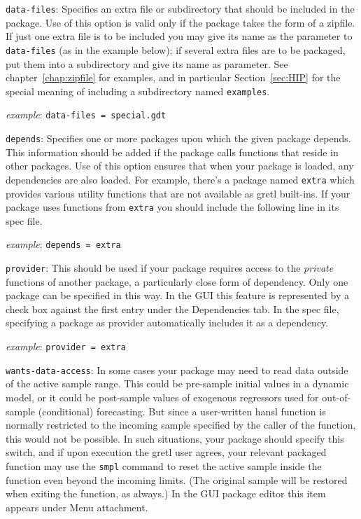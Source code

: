\documentclass[oneside]{book}
\newcommand{\ttusage}[1]{\textit{example}: \quad \texttt{#1}}
\begin{document}
\begin{description}

\item \texttt{data-files}: Specifies an extra file or subdirectory
  that should be included in the package. Use of this option is valid
  only if the package takes the form of a zipfile. If just one extra
  file is to be included you may give its name as the parameter to
  \texttt{data-files} (as in the example below); if several extra
  files are to be packaged, put them into a subdirectory and give its
  name as parameter. See chapter~\ref{chap:zipfile} for examples, and
  in particular Section~\ref{sec:HIP} for the special meaning of
  including a subdirectory named \texttt{examples}.

  \ttusage{data-files = special.gdt}

\item \texttt{depends}: Specifies one or more packages upon which the
  given package depends. This information should be added if the
  package calls functions that reside in other packages.  Use of this
  option ensures that when your package is loaded, any dependencies
  are also loaded.  For example, there's a package named
  \texttt{extra} which provides various utility functions that are not
  available as gretl built-ins.  If your package uses functions from
  \texttt{extra} you should include the following line in its spec
  file.

  \ttusage{depends = extra}

\item \texttt{provider}: This should be used if your package requires
  access to the \textit{private} functions of another package, a
  particularly close form of dependency. Only one package can be
  specified in this way.  In the GUI this feature is represented by a
  check box against the first entry under the \textsf{Dependencies}
  tab. In the spec file, specifying a package as provider
  automatically includes it as a dependency.

  \ttusage{provider = extra}

\item \texttt{wants-data-access}: In some cases your package may need
  to read data outside of the active sample range. This could be
  pre-sample initial values in a dynamic model, or it could be
  post-sample values of exogenous regressors used for out-of-sample
  (conditional) forecasting.  But since a user-written hansl function
  is normally restricted to the incoming sample specified by the
  caller of the function, this would not be possible. In such
  situations, your package should specify this switch, and if upon
  execution the gretl user agrees, your relevant packaged function may
  use the \texttt{smpl} command to reset the active sample inside the
  function even beyond the incoming limits. (The original sample will
  be restored when exiting the function, as always.) In the GUI
  package editor this item appears under \textsf{Menu attachment}.


\end{description}
\end{document}
